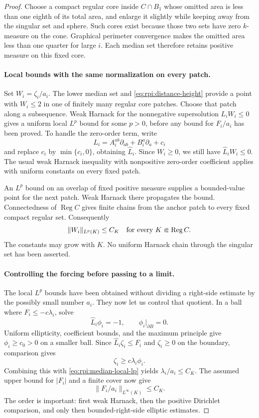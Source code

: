 \begin{proof}


Choose a compact regular core inside $C\cap B_1$ whose omitted
area is less than one eighth of its total area, and enlarge it
slightly while keeping away from the singular set and sphere.
Such cores exist because those two sets have zero $k$-measure on
the cone. Graphical perimeter convergence makes the omitted area
less than one quarter for large $i$. Each median set therefore
retains positive measure on this fixed core.

\paragraph{Local bounds with the same normalization on every patch.}
Set $W_i=\zeta_i/a_i$. The lower median set and
\eqref{eq:rpi:distance-height} provide a point with $W_i\le2$ in
one of finitely many regular core patches. Choose that patch along
a subsequence. Weak Harnack for the nonnegative supersolution
$L_iW_i\le0$ gives a uniform local $L^p$ bound for some $p>0$,
before any bound for $F_i/a_i$ has been proved. To handle the
zero-order term, write
\[
 L_i=A_i^{ab}\partial_{ab}+B_i^a\partial_a+c_i
\]
and replace $c_i$ by $\min\{c_i,0\}$, obtaining $\widehat L_i$.
Since $W_i\ge0$, we still have $\widehat L_iW_i\le0$.
The usual weak Harnack inequality with nonpositive zero-order
coefficient applies with uniform constants on every fixed patch.

An $L^p$ bound on an overlap of fixed positive measure supplies a
bounded-value point for the next patch. Weak Harnack there propagates
the bound. Connectedness of $\operatorname{Reg}C$ gives finite
chains from the anchor patch to every fixed compact regular set.
Consequently
\begin{equation}\label{eq:rpi:median-local-lp}
 \|W_i\|_{L^p(K)}\le C_K
 \quad\hbox{for every }K\Subset\operatorname{Reg}C.
\end{equation}
The constants may grow with $K$. No uniform Harnack chain through
the singular set has been asserted.

\paragraph{Controlling the forcing before passing to a limit.}
The local $L^p$ bounds have been obtained without dividing a
right-side estimate by the possibly small number $a_i$. They now
let us control that quotient. In a ball
where $F_i\le-c\lambda_i$, solve
\[
 \widehat L_i\phi_i=-1,\qquad \phi_i|_{\partial B}=0.
\]
Uniform ellipticity, coefficient bounds, and the maximum principle
give $\phi_i\ge c_0>0$ on a smaller ball. Since
$\widehat L_i\zeta_i\le F_i$ and $\zeta_i\ge0$ on the boundary,
comparison gives
\[
 \zeta_i\ge c\lambda_i\phi_i.
\]
Combining this with \eqref{eq:rpi:median-local-lp} yields
$\lambda_i/a_i\le C_K$. The assumed upper bound for $|F_i|$
and a finite cover now give
\begin{equation}\label{eq:rpi:median-forcing-bound}
 \|F_i/a_i\|_{L^\infty(K)}\le C_K.
\end{equation}
The order is important: first weak Harnack, then the positive
Dirichlet comparison, and only then bounded-right-side elliptic
estimates.


\end{proof}
